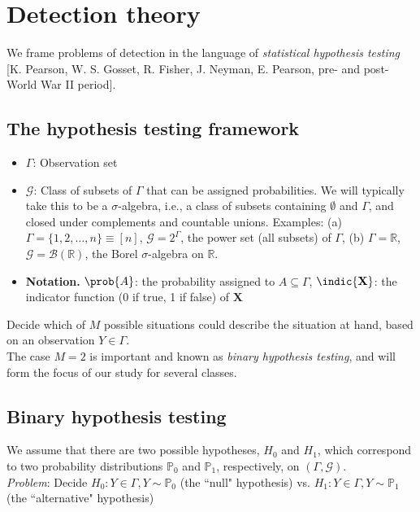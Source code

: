 \documentclass[12pt]{report}
\begin{document}
\section{Detection theory}

We frame problems of detection in the language of {\em statistical hypothesis testing} [K. Pearson, W. S. Gosset, R. Fisher, J. Neyman, E. Pearson, pre- and post- World War II period]. 

\subsection{The hypothesis testing framework}
\begin{itemize}
\item $\Gamma$: Observation set
\item $\mathcal{G}$: Class of subsets of $\Gamma$ that can be assigned probabilities. We will typically take this to be a $\sigma$-algebra, i.e., a class of subsets containing $\emptyset$ and $\Gamma$, and closed under complements and countable unions. Examples: (a) $\Gamma = \{1, 2, \ldots, n\} \equiv [n]$, $\mathcal{G} = 2^\Gamma$, the power set (all subsets) of $\Gamma$, (b) $\Gamma = \mathbb{R}$, $\mathcal{G} = \mathcal{B}(\mathbb{R})$, the Borel $\sigma$-algebra on $\mathbb{R}$.

\item {\bf Notation.} $\prob{A}$: the probability assigned to $A \subseteq \Gamma$, $\indic{\mathbf{X}}$: the indicator function (0 if true, 1 if false) of $\mathbf{X}$
\end{itemize}

 Decide which of $M$ possible situations could describe the situation at hand, based on an observation $Y \in \Gamma$. \\

The case $M = 2$ is important and known as {\em binary hypothesis testing}, and will form the focus of our study for several classes. 

\subsection{Binary hypothesis testing}
We assume that there are two possible hypotheses, $H_0$ and $H_1$, which correspond to two probability distributions $\mathbb{P}_0$ and $\mathbb{P}_1$, respectively, on $(\Gamma, \mathcal{G})$. \\

{\em Problem}: Decide \noindent $H_0: Y \in \Gamma, Y \sim \mathbb{P}_0$ (the ``null" hypothesis) vs. \noindent $H_1: Y \in \Gamma, Y \sim \mathbb{P}_1$ (the ``alternative" hypothesis)
\end{document}
